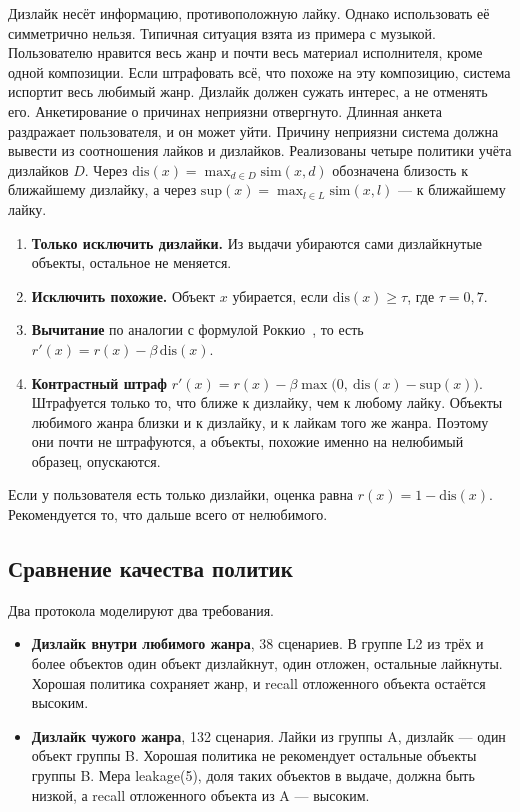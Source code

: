 Дизлайк несёт информацию, противоположную лайку. Однако использовать её симметрично нельзя. Типичная ситуация взята из примера с музыкой. Пользователю нравится весь жанр и почти весь материал исполнителя, кроме одной композиции. Если штрафовать всё, что похоже на эту композицию, система испортит весь любимый жанр. Дизлайк должен сужать интерес, а не отменять его. Анкетирование о причинах неприязни отвергнуто. Длинная анкета раздражает пользователя, и он может уйти. Причину неприязни система должна вывести из соотношения лайков и дизлайков. Реализованы четыре политики учёта дизлайков $D$. Через $\mathrm{dis}(x) = \max_{d\in D}\mathrm{sim}(x,d)$ обозначена близость к ближайшему дизлайку, а через $\mathrm{sup}(x) = \max_{l\in L}\mathrm{sim}(x,l)$ --- к ближайшему лайку.
\begin{enumerate}[leftmargin=1.6\parindent]
	\item \textbf{Только исключить дизлайки.} Из выдачи убираются сами дизлайкнутые объекты, остальное не меняется.
	\item \textbf{Исключить похожие.} Объект $x$ убирается, если $\mathrm{dis}(x)\geq\tau$, где $\tau = 0{,}7$.
	\item \textbf{Вычитание} по аналогии с формулой Роккио~\cite{rocchio1971, manning2008}, то есть $r'(x) = r(x) - \beta\,\mathrm{dis}(x)$.
	\item \textbf{Контрастный штраф} $r'(x) = r(x) - \beta\max\bigl(0,\ \mathrm{dis}(x) - \mathrm{sup}(x)\bigr)$. Штрафуется только то, что ближе к дизлайку, чем к любому лайку. Объекты любимого жанра близки и к дизлайку, и к лайкам того же жанра. Поэтому они почти не штрафуются, а объекты, похожие именно на нелюбимый образец, опускаются.
\end{enumerate}
Если у пользователя есть только дизлайки, оценка равна $r(x) = 1 - \mathrm{dis}(x)$. Рекомендуется то, что дальше всего от нелюбимого.

\subsection{Сравнение качества политик}

Два протокола моделируют два требования.
\begin{itemize}[leftmargin=1.6\parindent, label*=---]
	\item \textbf{Дизлайк внутри любимого жанра}, 38 сценариев. В группе L2 из трёх и более объектов один объект дизлайкнут, один отложен, остальные лайкнуты. Хорошая политика сохраняет жанр, и recall отложенного объекта остаётся высоким.
	\item \textbf{Дизлайк чужого жанра}, 132 сценария. Лайки из группы A, дизлайк --- один объект группы B. Хорошая политика не рекомендует остальные объекты группы B. Мера leakage(5), доля таких объектов в выдаче, должна быть низкой, а recall отложенного объекта из A --- высоким.
\end{itemize}

